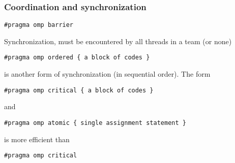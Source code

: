 \documentclass{beamer}
\begin{document}
\begin{frame}
\frametitle{Coordination and synchronization}

\begin{block}{}


\begin{verbatim}
#pragma omp barrier

\end{verbatim}

Synchronization, must be encountered by all threads in a team (or none)


\begin{verbatim}
#pragma omp ordered { a block of codes }

\end{verbatim}

is another form of synchronization (in sequential order).
The form


\begin{verbatim}
#pragma omp critical { a block of codes }

\end{verbatim}

and 


\begin{verbatim}
#pragma omp atomic { single assignment statement }

\end{verbatim}

is  more efficient than 


\begin{verbatim}
#pragma omp critical

\end{verbatim}


\end{block}
\end{frame}
\end{document}
